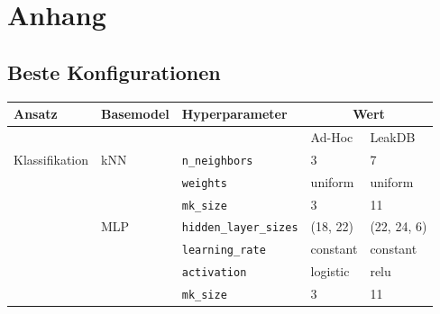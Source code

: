 \chapter{Anhang}

\section{Beste Konfigurationen \label{appendix-best-conf}}

\begin{table}[ht]
    \footnotesize
    \begin{tabular}{lllll}
    Ansatz              & Basemodel & Hyperparameter                & \multicolumn{2}{c}{Wert} \\ \hline
                        &           &                               & Ad-Hoc      & LeakDB      \\ \cline{4-5} 
    Klassifikation      & kNN       & \texttt{n\_neighbors}         & 3           & 7           \\
                        &           & \texttt{weights}              & uniform     & uniform     \\
                        &           & \texttt{mk\_size}             & 3           & 11          \\
                        & MLP       & \texttt{hidden\_layer\_sizes} & (18, 22)    & (22, 24, 6) \\
                        &           & \texttt{learning\_rate}       & constant    & constant    \\
                        &           & \texttt{activation}           & logistic    & relu        \\
                        &           & \texttt{mk\_size}             & 3           & 11          \\
    \end{tabular}
\end{table}
